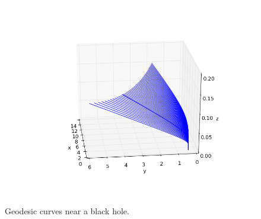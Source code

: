 \documentclass[main.tex]{subfiles}
\begin{document}
\begin{figure}[H]
	{
	\includegraphics[scale=0.45,natwidth=812,natheight=612]
	{../figures/geodesic_curve_for_3d_kerr_metric4.png}}
\caption[Geodesic curves near a black hole.]{Geodesic curves near a black hole.}
\end{figure}
\end{document}
